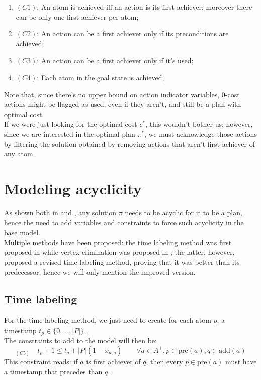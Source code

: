 \begin{enumerate}
    \item[]$(C1)$: An atom is achieved iff an action is its first achiever; moreover there can be only one first achiever per atom;
    \item[]$(C2)$: An action can be a first achiever only if its preconditions are achieved;
    \item[]$(C3)$: An action can be a first achiever only if it's used;
    \item[]$(C4)$: Each atom in the goal state is achieved;
\end{enumerate}
Note that, since there's no upper bound on action indicator variables, 0-cost actions might be flagged as used, even if they aren't, and still be a plan with optimal cost.\\
If we were just looking for the optimal cost $c^*$, this wouldn't bother us; however, since we are interested in the optimal plan $\pi^*$, we must acknowledge those actions by filtering the solution obtained by removing actions that aren't first achiever of any atom.

\section{Modeling acyclicity}
As shown both in \cite{Imai_15} and \cite{Rankooh_22}, any solution $\pi$ needs to be acyclic for it to be a plan, hence the need to add variables and constraints to force such acyclicity in the base model.\\
Multiple methods have been proposed: the time labeling method was first proposed in \cite{Imai_15} while vertex elimination was proposed in \cite{Rankooh_22}; the latter, however, proposed a revised time labeling method, proving that it was better than its predecessor, hence we will only mention the improved version.

\subsection{Time labeling}
For the time labeling method, we just need to create for each atom $p$, a timestamp $t_p\in\{0,...,|P|\}$.\\
The constraints to add to the model will then be:
$$_{(C5)}\quad t_p + 1 \leq t_q + |P|(1-x_{a, q})\qquad\forall a\in A^+,p\in \mbox{pre}(a),q\in \mbox{add}(a)$$
This constraint reads: if $a$ is first achiever of $q$, then every $p\in \mbox{pre}(a)$ must have a timestamp that precedes than $q$.

